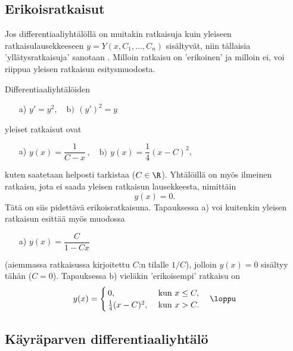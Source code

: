 \subsection*{Erikoisratkaisut}

Jos differentiaaliyhtälöllä on muitakin ratkaisuja kuin yleiseen ratkaisulausekkeeseen 
$y=Y(x,C_1,\ldots,C_n)$ sisältyvät, niin tällaisia 'yllätysratkaisuja' sanotaan 
. Milloin ratkaisu on 'erikoinen' ja milloin ei, voi riippua
yleisen ratkaisun esitysmuodosta.
\begin{Exa} \label{erikoinen dy}
Differentiaaliyhtälöiden
\begin{itemize}
\item[a)] $y'=y^2,\quad \text{b)}\,\ (y')^2=y$
\end{itemize}
yleiset ratkaisut ovat
\begin{itemize}
\item[a)] $y(x)=\dfrac{1}{C-x}\,,\quad \text{b)}\,\ y(x)=\dfrac{1}{4}(x-C)^2$,
\end{itemize}
kuten saatetaan helposti tarkistaa ($C\in\R$). Yhtälöillä on myös ilmeinen ratkaisu,
jota ei saada yleisen ratkaisun lausekkeesta, nimittäin
\[
y(x)=0.
\]
Tätä on siis pidettävä erikoisratkaisuna. Tapauksessa a) voi kuitenkin yleisen ratkaisun
esittää myös muodossa
\begin{itemize}
\item[a)] $y(x)=\dfrac{C}{1-Cx}$
\end{itemize}
(aiemmassa ratkaisussa kirjoitettu $C$:n tilalle $1/C$), jolloin $y(x)=0$ sisältyy tähän
($C=0$). Tapauksessa b) vieläkin 'erikoisempi' ratkaisu on
\[
y(x)=\begin{cases}
\,0,                  &\text{ kun } x\leq C, \\
\,\frac{1}{4}(x-C)^2, &\text{ kun } x>C.
\end{cases} \quad\loppu
\]
\end{Exa}

\subsection*{Käyräparven differentiaaliyhtälö}

